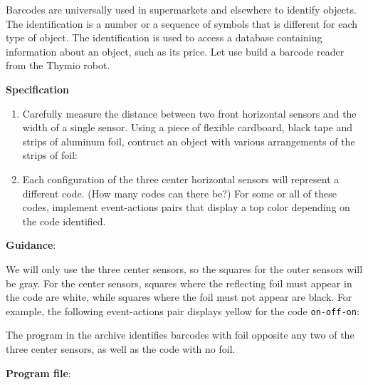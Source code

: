 
\label{ch.barcode}

Barcodes are universally used in supermarkets and elsewhere to identify
objects. The identification is a number or a sequence of symbols that is
different for each type of object. The identification is used to access
a database containing information about an object, such as its price.
Let use build a barcode reader from the Thymio robot.

\textbf{Specification}

\begin{enumerate}
\item Carefully measure the distance between two front horizontal
sensors and the width of a single sensor.
Using a piece of flexible cardboard, black tape and strips of aluminum
foil, contruct an object with various arrangements of the strips of foil:

\begin{center}
\end{center}

\item Each configuration of the three center horizontal sensors will
represent a different code. (How many codes can there be?) For some or
all of these codes, implement event-actions pairs that display a top
color depending on the code identified.

\end{enumerate}

\textbf{Guidance}:

We will only use the three center sensors, so the squares for the
outer sensors will be gray. For the center sensors, squares where the
reflecting foil must appear in the code are white, while squares where
the foil must not appear are black. For example, the following
event-actions pair displays yellow for the code \texttt{on-off-on}:


The program in the archive identifies barcodes with foil opposite any
two of the three center sensors, as well as the code with no foil.

{\raggedleft \hfill \textbf{Program file}: }

